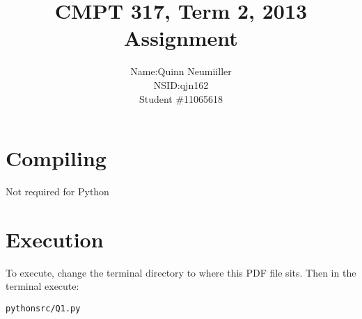 \documentclass{article}
\title{CMPT 317, Term 2, 2013\\
Assignment \AssignmentNum\\
\AssignmentTitle
}
\author{
	\begin{tabular}{ l r }
	  Name: & Quinn Neumiiller \\
	  NSID: & qjn162 \\
	  Student \# & 11065618 \\
	\end{tabular}
}
\date{\AssignmentDate}
\newcommand{\QuestionNum}{1}
\begin{document}
   \maketitle
   
   \section{Compiling}
   Not required for Python

   \section{Execution}
   To execute, change the terminal directory to where this PDF file sits.
   Then in the terminal execute:
	\begin{alltt}
	python src/Q\QuestionNum.py
	\end{alltt}


\end{document}
